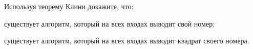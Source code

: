 Используя теорему Клини докажите, что:
\begin{enumcyr}
    \item существует алгоритм, который на всех входах выводит свой номер;
    \item существует алгоритм, который на всех входах выводит квадрат своего номера.
\end{enumcyr}